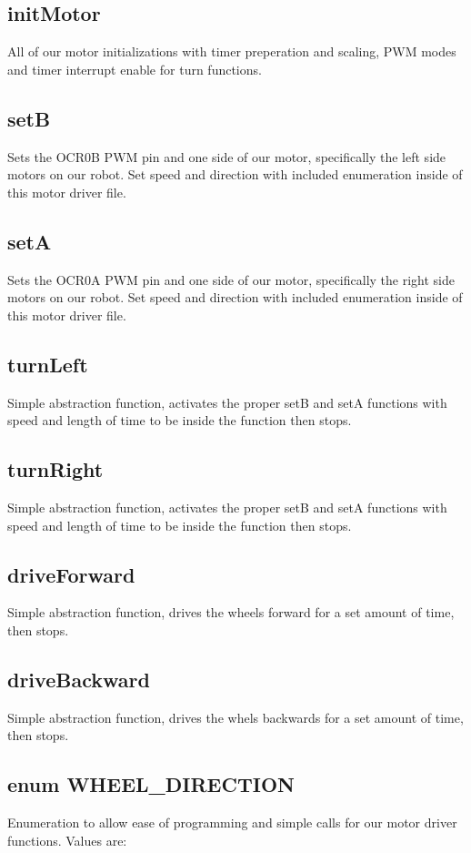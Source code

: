 \documentclass[letterpaper,11pt]{texMemo} %
\begin{document}
\subsection*{initMotor}
All of our motor initializations with timer preperation and 
scaling, PWM modes and timer interrupt enable for turn functions.

\subsection*{setB}
Sets the OCR0B PWM pin and one side of our motor, specifically the 
left side motors on our robot. Set speed and direction with included 
enumeration inside of this motor driver file.

\subsection*{setA}
Sets the OCR0A PWM pin and one side of our motor, specifically the 
right side motors on our robot. Set speed and direction with included 
enumeration inside of this motor driver file.

\subsection*{turnLeft}
Simple abstraction function, activates the proper setB and setA functions 
with speed and length of time to be inside the function then stops.

\subsection*{turnRight}
Simple abstraction function, activates the proper setB and setA functions 
with speed and length of time to be inside the function then stops.

\subsection*{driveForward}
Simple abstraction function, drives the wheels forward for a set amount 
of time, then stops.

\subsection*{driveBackward}
Simple abstraction function, drives the whels backwards for a set amount
of time, then stops.

\subsection*{enum WHEEL\_DIRECTION}
Enumeration to allow ease of programming and simple calls for our motor driver
functions. Values are: 
\end{document}

